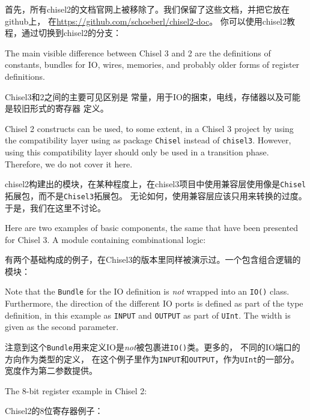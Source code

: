 \documentclass[%
    10pt,
    headinclude, footexclude,
    openright, %
    notitlepage,
    cleardoubleempty,
    headsepline,
    pointlessnumbers,
    bibtotoc, idxtotoc,
    ]{scrbook}
\newcommand{\code}[1]{{\small{\texttt{#1}}}}
\begin{document}
{首先，所有chisel2的文档官网上被移除了。我们保留了这些文档，并把它放在github上，
在\url{https://github.com/schoeberl/chisel2-doc}。
你可以使用chisel2教程，通过切换到chisel2的分支：


The main visible difference between Chisel 3 and 2 are the definitions of
constants, bundles for IO, wires, memories, and probably older forms of register
definitions.

Chisel3和2之间的主要可见区别是
常量，用于IO的捆束，电线，存储器以及可能是较旧形式的寄存器
定义。

Chisel 2 constructs can be used, to some extent, in a Chisel 3 project by
using the compatibility layer using as package \code{Chisel} instead of \code{chisel3}.
However, using this compatibility layer should only be used in a transition phase.
Therefore, we do not cover it here.

chisel2构建出的模块，在某种程度上，在chisel3项目中使用兼容层使用像是\code{Chisel}拓展包，而不是\code{Chisel3}拓展包。
无论如何，使用兼容层应该只用来转换的过度。于是，我们在这里不讨论。

Here are two examples of basic components, the same that have been presented
for Chisel 3. A module containing combinational logic:

有两个基础构成的例子，在Chisel3的版本里同样被演示过。一个包含组合逻辑的模块：


Note that the \code{Bundle} for the IO definition is \emph{not} wrapped into
an \code{IO()} class.  Furthermore, the direction of the different IO ports is defined
as part of the type definition, in this example as \code{INPUT} and \code{OUTPUT}
as part of \code{UInt}. The width is given as the second parameter.

注意到这个\code{Bundle}用来定义IO是\emph{not}被包裹进\code{IO()}类。更多的， 不同的IO端口的方向作为类型的定义，
在这个例子里作为\code{INPUT}和\code{OUTPUT}，作为\code{UInt}的一部分。宽度作为第二参数提供。

\begin{minipage}{\linewidth}
The 8-bit register example in Chisel 2:

Chisel2的8位寄存器例子：

\end{minipage}

}
\end{document}

